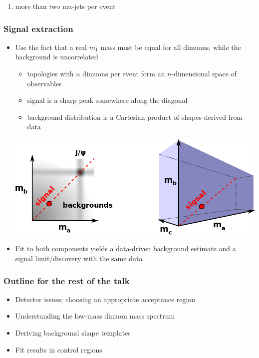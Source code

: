 \documentclass[compress]{beamer}
\begin{document}
\begin{frame}
\begin{center}
\begin{minipage}{0.8\linewidth}
\begin{enumerate}
\item \scriptsize more than two mu-jets per event
\end{enumerate}
\end{minipage}
\end{center}
\end{frame}

\begin{frame}
\frametitle{Signal extraction}

\begin{itemize}
\item Use the fact that a real $m_1$ mass must be equal for all
  dimuons, while the background is uncorrelated
\begin{itemize}
\item topologies with $n$ dimuons per event form an $n$-dimensional
  space of observables
\item signal is a sharp peak somewhere along the diagonal
\item background distribution is a Cartesian product of shapes derived from data
\end{itemize}

\begin{center}
\includegraphics[width=0.9\linewidth]{diagonal.png}
\end{center}

\item Fit to both components yields a data-driven background estimate
  and a signal limit/discovery with the same data
\end{itemize}
\end{frame}

\begin{frame}
\frametitle{Outline for the rest of the talk}
\begin{itemize}\setlength{\itemsep}{0.75 cm}
\item Detector issues; choosing an appropriate acceptance region
\item Understanding the low-mass dimuon mass spectrum
\item Deriving background shape templates
\item Fit results in control regions
\end{itemize}
\end{frame}
\end{document}
